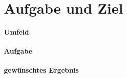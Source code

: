 \chapter{Aufgabe und Ziel}

\subsubsection{Umfeld}
\loreipsum

\subsubsection{Aufgabe}
\loreipsum

\subsubsection{gewünschtes Ergebnis}
\loreipsum
